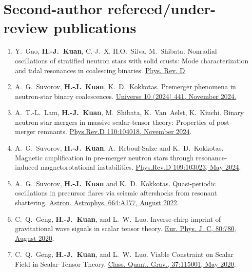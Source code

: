 \documentclass[10pt,floatfix,a4paper]{article}
\begin{document}
\section*{Second-author refereed/under-review publications}
\begin{enumerate}
	\item Y.~Gao, \textbf{H.-J.~Kuan}, C.-J.~X, H.O.~Silva, M.~Shibata. Nonradial oscillations of stratified neutron stars with solid crusts: Mode characterization and tidal resonances in coalescing binaries. \href{https://arxiv.org/abs/2509.00257}{Phys. Rev. D}
	\item A.~G.~Suvorov, \textbf{H.-J.~Kuan}, K.~D.~Kokkotas. Premerger phenomena in neutron-star binary coalescences. \href{https://www.mdpi.com/2218-1997/10/12/441}{Universe 10 (2024) 441, November 2024.}
	\item A.~T.-L.~Lam, \textbf{H.-J.~Kuan}, M.~Shibata, K.~Van~Aelst, K.~Kiuchi. Binary neutron star mergers in massive scalar-tensor theory: Properties of post-merger remnants. \href{https://journals.aps.org/prd/abstract/10.1103/PhysRevD.110.104018}{Phys.Rev.D 110:104018, November 2024}.
	\item A.~G.~Suvorov, \textbf{H.-J.~Kuan}, A.~Reboul-Salze and K.~D.~Kokkotas. Magnetic amplification in pre-merger neutron stars through resonance-induced magnetorotational instabilities.  \href{https://journals.aps.org/prd/abstract/10.1103/PhysRevD.109.103023}{Phys.Rev.D 109:103023, May 2024}.
	\item A.~G.~Suvorov, \textbf{H.-J.~Kuan} and K.~D.~Kokkotas. Quasi-periodic oscillations in precursor flares via seismic aftershocks from resonant shattering. \href{https://www.aanda.org/articles/aa/full_html/2022/08/aa44082-22/aa44082-22.html}{Astron. Astrophys. 664:A177, August 2022}.
	\item C.~Q.~Geng, \textbf{H.-J.~Kuan}, and L.~W.~Luo. Inverse-chirp imprint of gravitational wave signals in scalar tensor theory. \href{https://doi.org/10.1140/epjc/s10052-020-8359-y}{Eur. Phys. J. C, 80:780, August 2020}.
	\item C.~Q.~Geng, \textbf{H.-J.~Kuan}, and L.~W.~Luo. Viable Constraint on Scalar Field in Scalar-Tensor Theory.	\href{https://doi.org/10.1088/1361-6382/ab86fb}{Class. Quant. Grav., 37:115001, May 2020}.
\end{enumerate}
\end{document}
